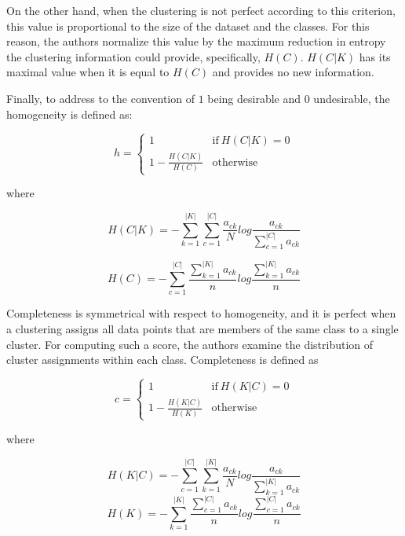 On the other hand, when the clustering is not perfect according to this criterion, this value is proportional to the size of the dataset and the classes.
For this reason, the authors normalize this value by the maximum reduction in entropy the clustering information could provide, specifically, $H(C)$.
$H(C|K)$ has its maximal value when it is equal to $H(C)$ and provides no new information.

Finally, to address to the convention of $1$ being desirable and $0$ undesirable, the homogeneity is defined as:

\begin{equation}
\label{equation:homo}
    h = \begin{cases} 1 & \text{if}\ H(C|K) = 0 \\1-\frac{H(C|K)}{H(C)} & \text{otherwise}\end{cases}
\end{equation}

where

\begin{equation}
    H(C|K) =  -\sum_{k=1}^{|K|}{\sum_{c=1}^{|C|}{\frac{a_{ck}}{N}log\frac{a_{ck}}{\sum_{c=1}^{|C|}{a_{ck}}}}}
\end{equation}

\vspace{1em}

\begin{equation}
    H(C) = -\sum_{c=1}^{|C|}{  \frac{\sum_{k=1}^{|K|}a_{ck}}{n}log \frac{\sum_{k=1}^{|K|}a_{ck}}{n} }
\end{equation}
\vspace{1em}

Completeness is symmetrical with respect to homogeneity, and it is perfect when a clustering assigns all data points that are members of the same class to a single cluster. 
For computing such a score, the authors examine the distribution of cluster assignments within each class.
Completeness is defined as 

\begin{equation}
\label{equation:completeness}
    c = \begin{cases} 1 & \text{if}\ H(K|C) = 0 \\1-\frac{H(K|C)}{H(K)} & \text{otherwise}\end{cases}
\end{equation}

where

\begin{equation}
    H(K|C) =  -\sum_{c=1}^{|C|}{\sum_{k=1}^{|K|}{\frac{a_{ck}}{N}log\frac{a_{ck}}{\sum_{k=1}^{|K|}{a_{ck}}}}}
\end{equation}
\vspace{2em}
\begin{equation}
    H(K) = -\sum_{k=1}^{|K|}{  \frac{\sum_{c=1}^{|C|}a_{ck}}{n}log \frac{\sum_{c=1}^{|C|}a_{ck}}{n} }
\end{equation}
\vspace{1em}

